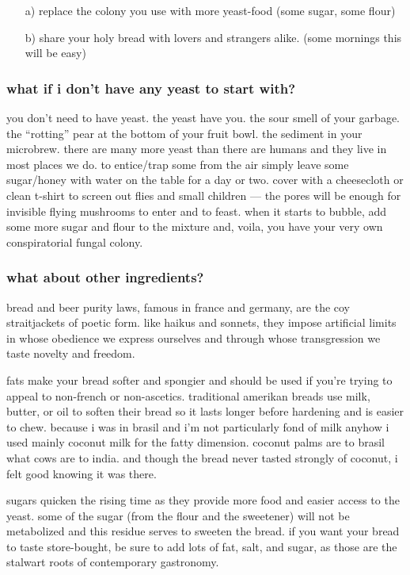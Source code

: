 \begin{enumerate}
  \item[a)] replace the colony you use with more yeast-food (some sugar,
  some flour)

  \item[b)] share your holy bread with lovers and strangers alike. (some
  mornings this will be easy)
\end{enumerate}

\subsubsection{what if i don't have any yeast to start with?}

you don't need to have yeast. the yeast have you. the sour smell of
your garbage. the ``rotting'' pear at the bottom of your fruit
bowl. the sediment in your microbrew. there are many more yeast than
there are humans and they live in most places we do. to entice/trap
some from the air simply leave some sugar/honey with water on the
table for a day or two. cover with a cheesecloth or clean t-shirt to
screen out flies and small children --- the pores will be enough for
invisible flying mushrooms to enter and to feast. when it starts to
bubble, add some more sugar and flour to the mixture and, voila, you
have your very own conspiratorial fungal colony.

\subsubsection{what about other ingredients?}

bread and beer purity laws, famous in france and germany, are the coy
straitjackets of poetic form. like haikus and sonnets, they impose
artificial limits in whose obedience we express ourselves and through
whose transgression we taste novelty and freedom.

fats make your bread softer and spongier and should be used if
you're trying to appeal to non-french or non-ascetics. traditional
amerikan breads use milk, butter, or oil to soften their bread so it
lasts longer before hardening and is easier to chew. because i was in
brasil and i'm not particularly fond of milk anyhow i used mainly
coconut milk for the fatty dimension. coconut palms are to brasil what
cows are to india. and though the bread never tasted strongly of
coconut, i felt good knowing it was there.

sugars quicken the rising time as they provide more food and easier
access to the yeast. some of the sugar (from the flour and the
sweetener) will not be metabolized and this residue serves to sweeten
the bread. if you want your bread to taste store-bought, be sure to
add lots of fat, salt, and sugar, as those are the stalwart roots of
contemporary gastronomy.

